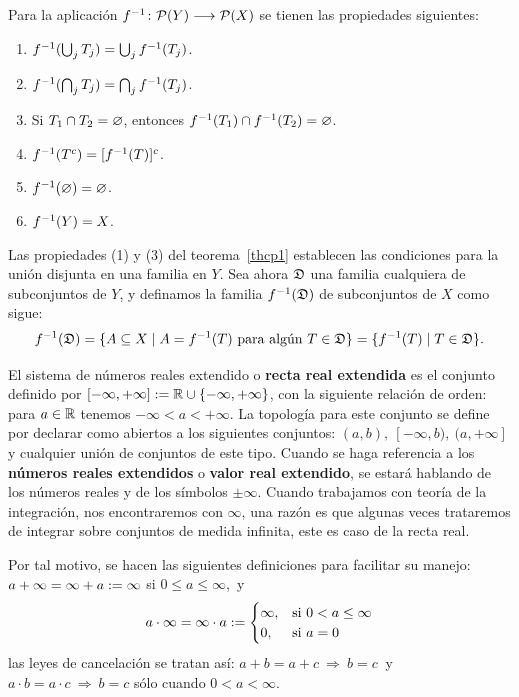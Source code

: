 \begin{thm}\label{thcp1}Para la aplicación $\ff \colon {\cal{P}} (Y)
\To {\cal{P}} (X)$ se tienen las propiedades siguientes:
\begin{enumerate}
    \vspace{-6pt} \item $f^{-1}(\bigcup_j T_j) = \bigcup_j
    f^{-1}(T_j)$.
    \vspace{-6pt} \item $f^{-1}(\bigcap_j T_j) = \bigcap_j
    f^{-1}(T_j)$.
    \vspace{-6pt} \item Si $T_1\cap T_2=\varnothing$, entonces
    $f^{-1}(T_1)\cap f^{-1}(T_2) = \varnothing$.
    \vspace{-6pt} \item $f^{-1}(T^c) = [f^{-1}(T)]^c$.
    \vspace{-6pt} \item $f^{-1}(\varnothing) = \varnothing$.
    \vspace{-6pt} \item $f^{-1}(Y) = X$.
\end{enumerate}
\end{thm}

Las propiedades (1) y (3) del teorema~\ref{thcp1} establecen las
condiciones para la unión disjunta en una familia en $Y$. Sea ahora
$\mathfrak{D}$ una familia cualquiera de subconjuntos de $Y$, y definamos la
familia $f^{-1} (\mathfrak{D})$ de subconjuntos de $X$ como
sigue:\begin{equation}\label{eq1}
    f^{-1}(\mathfrak{D}) = \{A\subseteq X \mid
A = f^{-1}(T) \mbox{ para algún } T\in \mathfrak{D}\} = \{f^{-1}(T) \mid T\in
\mathfrak{D}\}.
\end{equation}

El sistema de números reales extendido o \textbf{recta real
extendida} es el conjunto definido por $[-\infty,+\infty]:=\mathbb{R} \cup \{-\infty,
+\infty\}$, con la siguiente relación de orden: para $a\in \mathbb{R}$
tenemos $-\infty <a< +\infty$. La topología para este conjunto se
define por declarar como abiertos a los siguientes conjuntos:
$(a,b),\ [-\infty,b),\ (a,+\infty]$ y cualquier unión de conjuntos
de este tipo. Cuando se haga referencia a los \textbf{números reales
extendidos} o \textbf{valor real extendido}, se estará hablando de
los números reales y de los símbolos $\pm\infty$. Cuando trabajamos
con teoría de la integración, nos encontraremos con $\infty$, una
razón es que algunas veces trataremos de integrar sobre conjuntos de
medida infinita, este es caso de la recta real.

Por tal motivo, se hacen las siguientes definiciones para
facilitar su manejo: $a+\infty = \infty+a := \infty$ si $0\leq a
\leq \infty$,~y
\begin{equation}\label{eq4}
    a\cdot \infty = \infty \cdot a
:=\begin{cases}
  \infty, & \mbox{si } 0 < a \leq \infty \\
  0, & \mbox{si } a = 0 \\
\end{cases}
\end{equation}las leyes de cancelación se tratan
así: $a+b = a+c\ \Rightarrow\ b=c\ $ y $a\cdot b =a\cdot c\
\Rightarrow\ b=c$ sólo cuando $0 < a < \infty$. 

